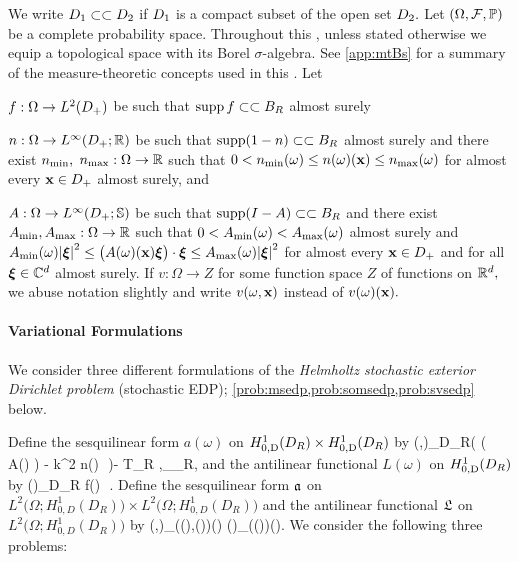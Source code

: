 We write $D_{1} \subset\subset D_{2}$ if $D_{1}$ is a compact subset of the open set $D_{2}.$ Let $\OFP$ be a complete probability space. Throughout this , unless stated otherwise we equip a topological space with its Borel $\sigma$-algebra. See \cref{app:mtBs} for a summary of the measure-theoretic concepts used in this . Let
\bit
\item $f:\Omega\rightarrow\LtDp$ be such that $\operatorname{supp} f \subset\subset B_{R}$ almost surely
\item $n:\Omega\rightarrow \LiDpRR$ be such that $\operatorname{supp}(1-n) \subset\subset B_{R}$ almost surely and there exist $n_{\min},$ $n_{\max}:\Omega\rightarrow \mathbb R$ such that
$0 < n_{\min}(\omega) \leq n(\omega)(\mathbf{x}) \leq n_{\max}(\omega)$
for almost every $\mathbf{x} \in D_{+}$ almost surely, and
\item $A:\Omega\rightarrow\LiDpRRdtd$ be such that $\operatorname{supp}(I-A) \subset\subset B_{R}$ and there exist $A_{\min},A_{\max}:\Omega \rightarrow \mathbb R$ such that $0 < A_{\min}(\omega) < A_{\max}(\omega)$ almost surely and
$\Amin(\omega)\abs{\bxi}^2 \leq \big(A(\omega)(\bx)\bxi\big)\cdot\bxi \leq \Amax(\omega)\abs{\bxi}^2$
for almost every $\mathbf{x} \in D_{+}$ and for all $\boldsymbol{\xi} \in \mathbb C^{d}$ almost surely.
\eit
If $v:\Omega \rightarrow Z$ for some function space $Z$ of functions on $\mathbb R^{d},$ we abuse notation slightly and write $v(\omega,\mathbf{x})$ instead of $v(\omega)(\mathbf{x}).$


%

\paragraph{Variational Formulations} We consider three different formulations of the  \emph{Helmholtz stochastic exterior Dirichlet problem} (stochastic EDP); \cref{prob:msedp,prob:somsedp,prob:svsedp} below.

Define the sesquilinear form $a(\omega)$ on $\HozDDR \times \HozDDR$ by
\beq\label{eq:SEDPa}
\mleft(\vo,\vt\mright)\de\int_{D_R}\Big( \mleft( A(\omega) \grad \vo\mright)\cdot \grad \vtb 
 - k^2 n(\omega)\, \vo\,\vtb \Big)\dd\Leb- \big\langle T_R \gamma \vo,\gamma \vt\big\rangle_{\Gamma_R},
 \eeq
 and the antilinear functional $L(\omega)$ on $\HozDDR$ by
\beq\label{eq:SEDPL}
(\vt)\de \int_{D_R} f(\omega)\, \vtb\,\dd\Leb.
\eeq
Define the sesquilinear form $\mathfrak{a}$ on $L^2\big(\Omega;H_{0,D}^1(D_R)\big)\times L^2\big(\Omega;H_{0,D}^1(D_R)\big)$ and the antilinear functional $\mathfrak{L}$ on $L^2\big(\Omega;H_{0,D}^1(D_R)\big)$ by 
\beq\label{eq:SEDPas}
\as\mleft(\vo,\vt\mright)\de \int_\Omega {}\mleft(\vo(\omega),\vt(\omega)\mright)\dd\PP(\omega)
\quad{} \quad
%
\Ls(\vt)\de \int_\Omega {}\mleft(\vt(\omega)\mright)\dd\PP(\omega).
\eeq
We consider the following three problems:

